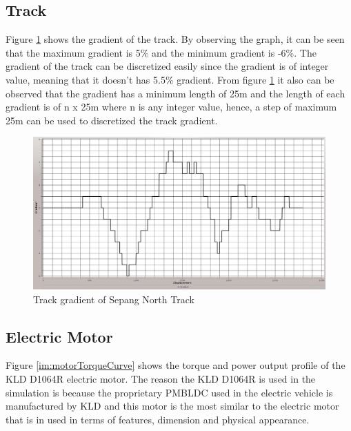 \subsection{Track}
Figure \ref{im:trackGradient} shows the gradient of the track. By observing the graph, it can be seen that the maximum gradient is 5\% and the minimum gradient is -6\%. The gradient of the track can be discretized easily since the gradient is of integer value, meaning that it doesn't has 5.5\% gradient. From figure \ref{im:trackGradient} it also can be observed that the gradient has a minimum length of 25m and the length of each gradient is of n x 25m where n is any integer value, hence, a step of maximum 25m can be used to discretized the track gradient.

\begin{figure} [htb]
	\centering
	\includegraphics[width=6in]{images/track_gradient.jpg}
	\caption{Track gradient of Sepang North Track}
	\label{im:trackGradient}
\end{figure}

\subsection{Electric Motor}
Figure \ref{im:motorTorqueCurve} shows the torque and power output profile of the KLD D1064R electric motor. The reason the KLD D1064R is used in the simulation is because the proprietary PMBLDC used in the electric vehicle is manufactured by KLD and this motor is the most similar to the electric motor that is in used in terms of features, dimension and physical appearance. 

